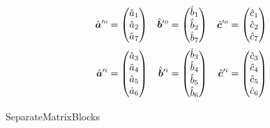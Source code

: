 \begin{equation}
    \begin{aligned}
        \hat{\bm{a}}'^o &= \begin{pmatrix}\hat{a}_1\\\hat{a}_2\\\hat{a}_7\end{pmatrix}
        &
        \hat{\bm{b}}'^o &= \begin{pmatrix}\hat{b}_1\\\hat{b}_2\\\hat{b}_7\end{pmatrix}
        &
        \hat{\bm{c}}'^o &= \begin{pmatrix}\hat{c}_1\\\hat{c}_2\\\hat{c}_7\end{pmatrix}
        \\
        \hat{\bm{a}}'^i &= \begin{pmatrix}\hat{a}_3\\\hat{a}_4\\\hat{a}_5\\\hat{a}_6\end{pmatrix}
        &
        \hat{\bm{b}}'^i &= \begin{pmatrix}\hat{b}_3\\\hat{b}_4\\\hat{b}_5\\\hat{b}_6\end{pmatrix}
        &
        \hat{\bm{c}}'^i &= \begin{pmatrix}\hat{c}_3\\\hat{c}_4\\\hat{c}_5\\\hat{c}_6\end{pmatrix}
    \end{aligned}
    \label{eq:qa_qb_qc_decomposed}
\end{equation}

\begin{algorithm}
    \caption{SeparateMatrixBlocks}
    \label{algo:separate_matrix_blocks}
    \begin{algorithmic}
         
         
        \\ 
        \EndFunction
    \end{algorithmic}
\end{algorithm}

